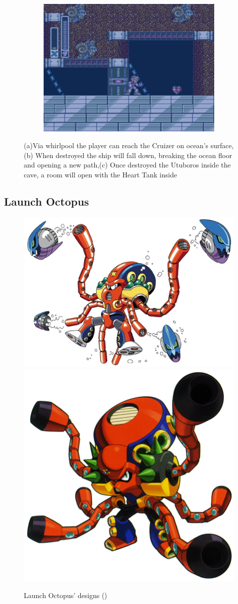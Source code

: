 \begin{figure}[htp]
\begin{subfigure}{0.4\textwidth}
		\includegraphics[width=\linewidth]{figures/X1/Launch_octopus/Octopus_heart_3.jpg}
		\caption{}
	\end{subfigure}
	\caption{(a)Via whirlpool the player can reach the Cruizer on ocean's surface,(b) When destroyed the ship will fall down, breaking the ocean floor and opening a new path,(c) Once destroyed the Utuboros inside the cave, a room will open with the Heart Tank inside}
\end{figure}

\subsection{Launch Octopus}\label{boss:Launch_octopus}
\begin{figure}[htp]
	\centering
	\includegraphics[width=0.5\linewidth]{figures/X1/Launch_octopus/LaunchOctopus.jpg}
	\includegraphics[width=0.4\linewidth]{figures/X1/Launch_octopus/MHXLaunchOctopus.jpg}
	\caption{Launch Octopus' designs (\cite{book:MMX_Complete_art})}
\end{figure}

